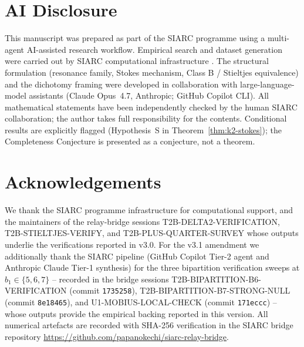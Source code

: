 \documentclass[11pt,a4paper]{article}
\theoremstyle{definition}
\begin{document}
\section*{AI Disclosure}

This manuscript was prepared as part of the SIARC programme using a multi-agent AI-assisted research workflow. Empirical search and dataset generation were carried out by SIARC computational infrastructure \cite{siarc2024}. The structural formulation (resonance family, Stokes mechanism, Class B / Stieltjes equivalence) and the dichotomy framing were developed in collaboration with large-language-model assistants (Claude Opus~4.7, Anthropic; GitHub Copilot CLI). All mathematical statements have been independently checked by the human SIARC collaboration; the author takes full responsibility for the contents. Conditional results are explicitly flagged (Hypothesis~S in Theorem~\ref{thm:k2-stokes}); the Completeness Conjecture is presented as a conjecture, not a theorem.

\section*{Acknowledgements}

We thank the SIARC programme infrastructure for computational support, and the maintainers of the relay-bridge sessions T2B-DELTA2-VERIFICATION, T2B-STIELTJES-VERIFY, and T2B-PLUS-QUARTER-SURVEY whose outputs underlie the verifications reported in v3.0. For the v3.1 amendment we additionally thank the SIARC pipeline (GitHub Copilot Tier-2 agent and Anthropic Claude Tier-1 synthesis) for the three bipartition verification sweeps at $b_1 \in \{5, 6, 7\}$ -- recorded in the bridge sessions T2B-BIPARTITION-B6-VERIFICATION (commit \texttt{1735258}), T2B-BIPARTITION-B7-STRONG-NULL (commit \texttt{8e18465}), and U1-MOBIUS-LOCAL-CHECK (commit \texttt{171eccc}) -- whose outputs provide the empirical backing reported in this version. All numerical artefacts are recorded with SHA-256 verification in the SIARC bridge repository \url{https://github.com/papanokechi/siarc-relay-bridge}.
\end{document}
